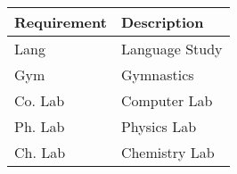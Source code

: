 \begin{tabular}{|ll|}
  \hline
  Requirement & Description \\\hline\hline
  Lang    & Language Study \\
  Gym     & Gymnastics   \\
  Co. Lab & Computer Lab \\
  Ph. Lab & Physics Lab  \\
  Ch. Lab & Chemistry Lab \\\hline
\end{tabular}

